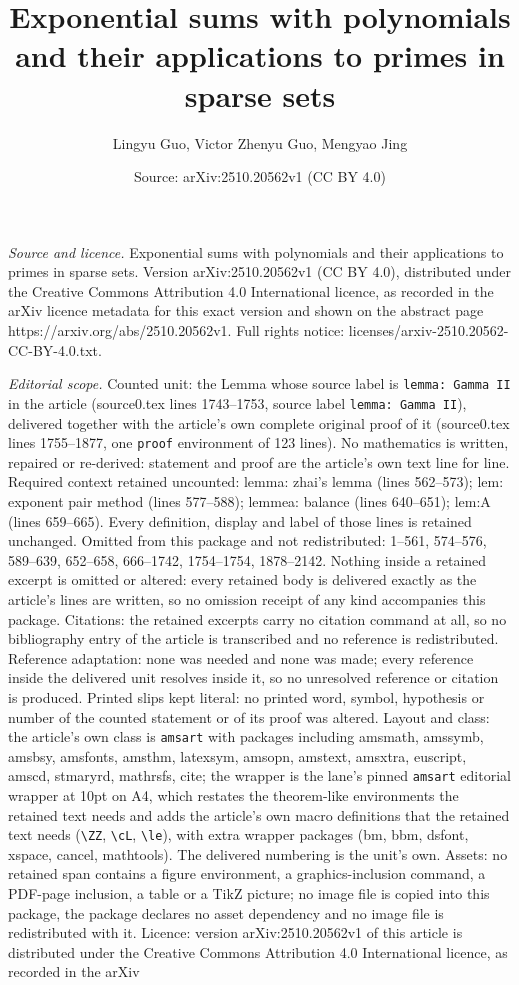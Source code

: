\documentclass[10pt,a4paper]{amsart}
\title[Exponential sums with polynomials and their applications to ]{Exponential sums with polynomials and their applications to primes in sparse sets}
\author{Lingyu Guo, Victor Zhenyu Guo, Mengyao Jing}
\date{Source: arXiv:2510.20562v1 (CC BY 4.0)}
\begin{document}
\maketitle

\noindent\emph{Source and licence.} Exponential sums with polynomials and their applications to primes in sparse sets. Version arXiv:2510.20562v1 (CC BY 4.0), distributed under the Creative Commons Attribution 4.0 International licence, as recorded in the arXiv licence metadata for this exact version and shown on the abstract page https://arxiv.org/abs/2510.20562v1. Full rights notice: licenses/arxiv-2510.20562-CC-BY-4.0.txt.\par\smallskip

\noindent\textit{Editorial scope.} Counted unit: the Lemma whose source label is \texttt{lemma: Gamma II} in the article (source0.tex lines 1743--1753, source label \texttt{lemma: Gamma II}), delivered together with the article's own complete original proof of it (source0.tex lines 1755--1877, one \texttt{proof} environment of 123 lines). No mathematics is written, repaired or re-derived: statement and proof are the article's own text line for line. Required context retained uncounted: lemma: zhai's lemma (lines 562--573); lem: exponent pair method (lines 577--588); lemmea: balance (lines 640--651); lem:A (lines 659--665). Every definition, display and label of those lines is retained unchanged. Omitted from this package and not redistributed: 1--561, 574--576, 589--639, 652--658, 666--1742, 1754--1754, 1878--2142. Nothing inside a retained excerpt is omitted or altered: every retained body is delivered exactly as the article's lines are written, so no omission receipt of any kind accompanies this package. Citations: the retained excerpts carry no citation command at all, so no bibliography entry of the article is transcribed and no reference is redistributed. Reference adaptation: none was needed and none was made; every reference inside the delivered unit resolves inside it, so no unresolved reference or citation is produced. Printed slips kept literal: no printed word, symbol, hypothesis or number of the counted statement or of its proof was altered. Layout and class: the article's own class is \texttt{amsart} with packages including amsmath, amssymb, amsbsy, amsfonts, amsthm, latexsym, amsopn, amstext, amsxtra, euscript, amscd, stmaryrd, mathrsfs, cite; the wrapper is the lane's pinned \texttt{amsart} editorial wrapper at 10pt on A4, which restates the theorem-like environments the retained text needs and adds the article's own macro definitions that the retained text needs (\texttt{\textbackslash ZZ}, \texttt{\textbackslash cL}, \texttt{\textbackslash le}), with extra wrapper packages (bm, bbm, dsfont, xspace, cancel, mathtools). The delivered numbering is the unit's own. Assets: no retained span contains a figure environment, a graphics-inclusion command, a PDF-page inclusion, a table or a TikZ picture; no image file is copied into this package, the package declares no asset dependency and no image file is redistributed with it. Licence: version arXiv:2510.20562v1 of this article is distributed under the Creative Commons Attribution 4.0 International licence, as recorded in the arXiv 
\end{document}

